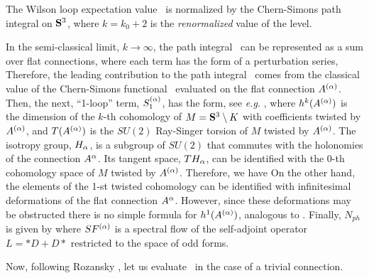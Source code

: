 The Wilson loop expectation value \njonesviaw\ is
normalized by the Chern-Simons path integral on $\S^3$,
%
\eqn{}
%
where $k=k_0+2$ is the {\it renormalized} value of the level.

In the semi-classical limit, $k \to \infty$, the path
integral \njonesviaw\ can be represented as a sum
over flat connections,
%
\eqn{}
%
where each term has the form of a perturbation series,
%
\eqn{}
%
Therefore, the leading contribution to the path integral
\njonesviaw\ comes from the classical value of the Chern-Simons
functional \csaction\ evaluated on the flat connection $A^{(\a)}$.
Then, the next, ``1-loop'' term, $S_1^{(\a)}$, has the form,
see {\it e.g.} ,
%
\eqn{}
%
where $h^k (A^{(\a)})$ is the dimension of the $k$-th cohomology
of $M = \S^3 \setminus K$ with coefficients twisted by $A^{(\a)}$,
and $T (A^{(\a)})$ is the $SU(2)$ Ray-Singer torsion of $M$
twisted by $A^{(\a)}$.
The isotropy group, $H_{\a}$, is a subgroup of $SU(2)$
that commutes with the holonomies of the connection $A^{\a}$.
Its tangent space, $TH_{\a}$, can be identified with
the 0-th cohomology space of $M$ twisted by $A^{(\a)}$.
Therefore, we have
%
\eqn{}
%
On the other hand, the elements of the 1-st twisted cohomology
can be identified with infinitesimal deformations of
the flat connection $A^{\a}$. However, since these deformations
may be obstructed there is no simple formula for $h^1 (A^{(\a)})$,
analogous to \hzerofla.
Finally, $N_{ph}$ is given by
%
\eqn{}
%
where $SF^{(\a)}$ is a spectral flow of the self-adjoint operator
$L=*D + D*$ restricted to the space of odd forms.

Now, following Rozansky \Rozansky,
let us evaluate \sconeloop\ in the case of a trivial connection.




